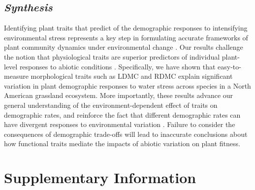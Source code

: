 \documentclass[12pt, letterpaper]{article}
\begin{document}
\subsection{\textit{Synthesis}} Identifying plant traits that predict of the demographic responses to intensifying environmental stress represents a key step in formulating accurate frameworks of plant community dynamics under environmental change \citep{Laughlin2020TheFitness}. Our results challenge the notion that physiological traits are superior predictors of individual plant-level responses to abiotic conditions \citep{Volaire2018}. Specifically, we have shown that easy-to-measure morphological traits such as LDMC and RDMC explain significant variation in plant demographic responses to water stress across species in a North American grassland ecosystem. More importantly, these results advance our general understanding of the environment-dependent effect of traits on demographic rates, and reinforce the fact that different demographic rates can have divergent responses to environmental variation \citep{Laughlin2020TheFitness}. Failure to consider the consequences of demographic trade-offs will lead to inaccurate conclusions about how functional traits mediate the impacts of abiotic variation on plant fitness. 





\renewcommand{\thetable}{S\arabic{table}} %
\setcounter{table}{0} %
\renewcommand{\thefigure}{S\arabic{figure}} %
\setcounter{figure}{0} %


\section{Supplementary Information}
\end{document}
